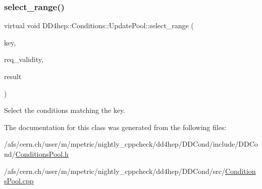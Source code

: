 \subsubsection{\texorpdfstring{select\+\_\+range()}{select\_range()}}
{\footnotesize\ttfamily virtual void D\+D4hep\+::\+Conditions\+::\+Update\+Pool\+::select\+\_\+range (\begin{DoxyParamCaption}\item[{\hyperlink{class_d_d4hep_1_1_conditions_1_1_condition_a7528efa762e8cc072ef80ea67c3531f9}{Condition\+::key\+\_\+type}}]{key,  }\item[{const \hyperlink{class_d_d4hep_1_1_conditions_1_1_condition_ad84300e226b2085ec5e9db7f47be5539}{Condition\+::iov\+\_\+type} \&}]{req\+\_\+validity,  }\item[{\hyperlink{namespace_d_d4hep_1_1_conditions_ae765f0140a33973a430280f02b6062f4}{Range\+Conditions} \&}]{result }\end{DoxyParamCaption})\hspace{0.3cm}{\ttfamily [pure virtual]}}



Select the conditions matching the key. 



The documentation for this class was generated from the following files\+:\begin{DoxyCompactItemize}
\item 
/afs/cern.\+ch/user/m/mpetric/nightly\+\_\+cppcheck/dd4hep/\+D\+D\+Cond/include/\+D\+D\+Cond/\hyperlink{_conditions_pool_8h}{Conditions\+Pool.\+h}\item 
/afs/cern.\+ch/user/m/mpetric/nightly\+\_\+cppcheck/dd4hep/\+D\+D\+Cond/src/\hyperlink{_conditions_pool_8cpp}{Conditions\+Pool.\+cpp}\end{DoxyCompactItemize}
